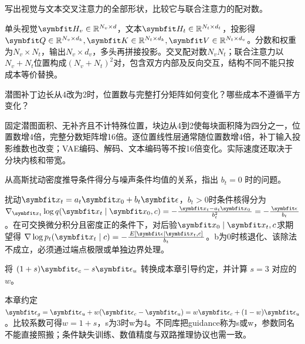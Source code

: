 
\begin{exercises}
\begin{exercise} 写出视觉与文本交叉注意力的全部形状，比较它与联合注意力的配对数。

\begin{solution}
单头视觉$\mat{H}_v\in\mathbb R^{N_v\times d}$，文本$\mat{H}_t\in\mathbb R^{N_t\times d_t}$，投影得$\mat{Q}\in\mathbb R^{N_v\times d_k},\mat{K}\in\mathbb R^{N_t\times d_k},\mat{V}\in\mathbb R^{N_t\times d_v}$。分数和权重为$N_v\times N_t$，输出$N_v\times d_v$，多头再拼接投影。交叉配对数$N_vN_t$；联合注意力以$N_v+N_t$位置构成$(N_v+N_t)^2$对，包含双方内部及反向交互，结构不同不能只按成本等价替换。
\end{solution}
\end{exercise}

\begin{exercise} 潜图补丁边长从4改为2时，位置数与完整打分矩阵如何变化？哪些成本不遵循平方变化？

\begin{solution}
固定潜图面积、无补齐且不计特殊位置，块边从4到2使每块面积降为四分之一，位置数增4倍，完整分数矩阵增16倍。逐位置线性层通常随位置数增4倍，补丁输入投影维数也改变；VAE编码、解码、文本编码等不按16倍变化。实际速度还取决于分块内核和带宽。
\end{solution}
\end{exercise}

\begin{exercise} 从高斯扰动密度推导条件得分与噪声条件均值的关系，指出 $b_t=0$ 时的问题。

\begin{solution}
扰动$\vect{x}_t=a_t\vect{x}_0+b_t\vect{\epsilon}$，$b_t>0$时条件核得分为$\nabla_{\vect{x}_t}\log q(\vect{x}_t\mid \vect{x}_0,c)=-\frac{\vect{x}_t-a_t\vect{x}_0}{b_t^2}=-\frac{\vect{\epsilon}}{b_t}$。在可交换微分积分且密度正的条件下，对后验$\vect{x}_0\mid \vect{x}_t,c$求期望得 $\nabla\log p_t(\vect{x}_t\mid c)=-\frac{E[\vect{\epsilon}\mid \vect{x}_t,c]}{b_t}$。b为0时核退化、该除法不成立，必须通过端点极限或单独边界处理。
\end{solution}
\end{exercise}

\begin{exercise} 将 $(1+s)\vect{\epsilon}_c-s\vect{\epsilon}_u$ 转换成本章引导约定，并计算 $s=3$ 对应的 $w$。

\begin{solution}
本章约定$\vect{\epsilon}_g=\vect{\epsilon}_u+w(\vect{\epsilon}_c-\vect{\epsilon}_u)=w\vect{\epsilon}_c+(1-w)\vect{\epsilon}_u$。比较系数可得$w=1+s$，s为3时w为4。不同库把guidance称为s或w，参数同名不能直接照搬；条件缺失训练、数值精度与双路推理协议也需一致。
\end{solution}
\end{exercise}


\end{exercises}
